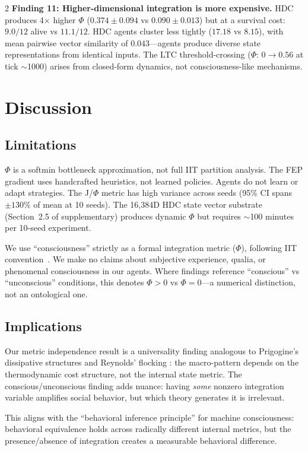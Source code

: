\documentclass[letterpaper]{article}
\begin{document}
\begin{multicols}{2}
\textbf{Finding 11: Higher-dimensional integration is more expensive.} HDC produces 4$\times$ higher $\Phi$ ($0.374 \pm 0.094$ vs $0.090 \pm 0.013$) but at a survival cost: $9.0/12$ alive vs $11.1/12$. HDC agents cluster less tightly ($17.18$ vs $8.15$), with mean pairwise vector similarity of $0.043$---agents produce diverse state representations from identical inputs. The LTC threshold-crossing ($\Phi$: $0 \to 0.56$ at tick $\sim$1000) arises from closed-form dynamics, not consciousness-like mechanisms.

\section{Discussion}

\subsection{Limitations}

$\Phi$ is a softmin bottleneck approximation, not full IIT partition analysis. The FEP gradient uses handcrafted heuristics, not learned policies. Agents do not learn or adapt strategies. The J/$\Phi$ metric has high variance across seeds (95\% CI spans $\pm 130$\% of mean at 10 seeds). The 16,384D HDC state vector substrate (Section~2.5 of supplementary) produces dynamic $\Phi$ but requires $\sim$100 minutes per 10-seed experiment.

We use ``consciousness'' strictly as a formal integration metric ($\Phi$), following IIT convention~\citep{tononi2004}. We make no claims about subjective experience, qualia, or phenomenal consciousness in our agents. Where findings reference ``conscious'' vs ``unconscious'' conditions, this denotes $\Phi > 0$ vs $\Phi = 0$---a numerical distinction, not an ontological one.

\subsection{Implications}

Our metric independence result is a universality finding analogous to Prigogine's dissipative structures \citep{prigogine1977} and Reynolds' flocking \citep{reynolds1987}: the macro-pattern depends on the thermodynamic cost structure, not the internal state metric. The conscious/unconscious finding adds nuance: having \emph{some} nonzero integration variable amplifies social behavior, but which theory generates it is irrelevant.

This aligns with the ``behavioral inference principle'' for machine consciousness: behavioral equivalence holds across radically different internal metrics, but the presence/absence of integration creates a measurable behavioral difference.


\end{multicols}
\end{document}
